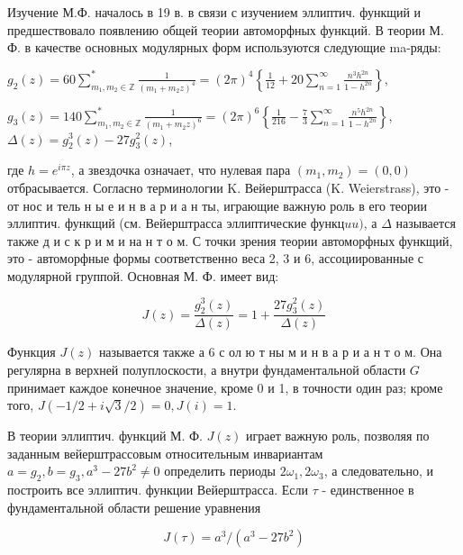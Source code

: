 \documentclass[10pt]{article}
\begin{document}
Изучение М.Ф. началось в 19 в. в связи с изучением эллиптич. функщий и предшествовало появлению общей теории автоморфных функций. В теории М. Ф. в качестве основных модулярных форм используются следующие ma-ряды:



$g_{2}(z)=60 \sum_{m_{1}, m_{2} \in \mathbb{Z}}^{*} \frac{1}{\left(m_{1}+m_{2} z\right)^{4}}=(2 \pi)^{4}\left\{\frac{1}{12}+20 \sum_{n=1}^{\infty} \frac{n^{3} h^{2 n}}{1-h^{2 n}}\right\}$,



$g_{3}(z)=140 \sum_{m_{1}, m_{2} \in \mathbb{Z}}^{*} \frac{1}{\left(m_{1}+m_{2} z\right)^{6}}=(2 \pi)^{6}\left\{\frac{1}{216}-\frac{7}{3} \sum_{n=1}^{\infty} \frac{n^{5} h^{2 n}}{1-h^{2 n}}\right\}$, $\Delta(z)=g_{2}^{3}(z)-27 g_{3}^{2}(z)$,



где $h=e^{i \pi z}$, а звездочка означает, что нулевая пара $\left(m_{1}, m_{2}\right)=(0,0)$ отбрасывается. Согласно терминологии K. Вейерштрасса (K. Weierstrass), это - от нос и тель н ы е и н в а р и а н ты, играющие важную роль в его теории эллиптич. функщий (см. Вейерштрасса эллиптические функ$ц u u)$, а $\Delta$ называется также д и с к р и м и на н т о м. С точки зрения теории автоморфных функщий, это - автоморфные формы соответственно веса 2, 3 и 6, ассоциированные с модулярной группой. Основная М. Ф. имеет вид:



\[

J(z)=\frac{g_{2}^{3}(z)}{\Delta(z)}=1+\frac{27 g_{3}^{2}(z)}{\Delta(z)}

\]



Функция $J(z)$ называется также а 6 с ол ю т ны м и н в а р и а н т о м. Она регулярна в верхней полуплоскости, а внутри фундаментальной области $G$ принимает каждое конечное значение, кроме 0 и 1, в точности один раз; кроме того, $J(-1 / 2+i \sqrt{3} / 2)=0, J(i)=1$.



В теории эллиптич. функций М. Ф. $J(z)$ играет важную роль, позволяя по заданным вейерштрассовым относительным инвариантам $a=g_{2}, b=g_{3}, a^{3}-27 b^{2} \neq 0$ определить периоды $2 \omega_{1}, 2 \omega_{3}$, а следовательно, и построить все эллиптич. функции Вейерштрасса. Если $\tau$ - единственное в фундаментальной области решение уравнения



\[

J(\tau)=a^{3} /\left(a^{3}-27 b^{2}\right)

\]
\end{document}
